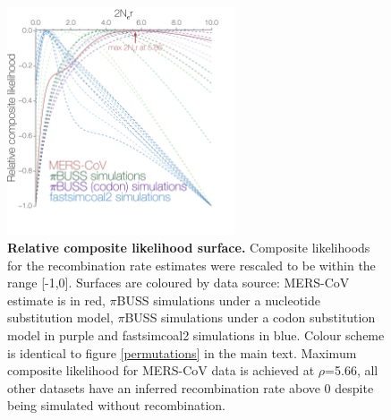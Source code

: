 \documentclass[11pt,oneside,letterpaper]{article}
\begin{document}
\begin{figure}[h]
	\centering	
	\includegraphics[width=0.6\textwidth]{figures/supp_MERS_compositeLikelihoods.png}
	\caption{\textbf{Relative composite likelihood surface.}
Composite likelihoods for the recombination rate estimates were rescaled to be within the range [-1,0].
Surfaces are coloured by data source: MERS-CoV estimate is in red, $\pi$BUSS simulations under a nucleotide substitution model, $\pi$BUSS simulations under a codon substitution model in purple and fastsimcoal2 simulations in blue.
Colour scheme is identical to figure \ref{permutations} in the main text.
Maximum composite likelihood for MERS-CoV data is achieved at $\rho$=5.66, all other datasets have an inferred recombination rate above 0 despite being simulated without recombination.}
	\label{compLikelihoods}
\end{figure}
\end{document}
